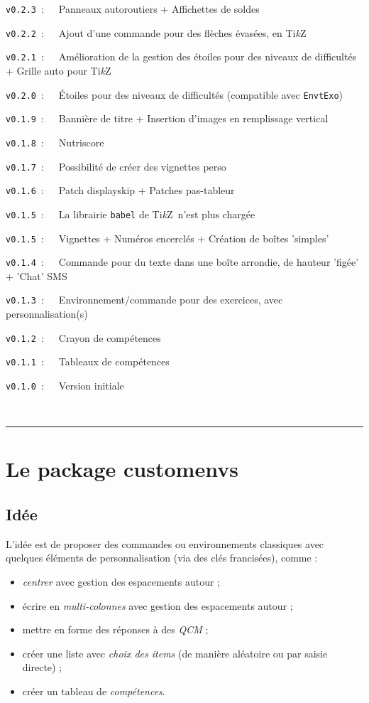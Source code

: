 \documentclass[french,11pt,a4paper]{article}
\providecommand\tikzlogo{Ti\textit{k}Z}
\let\TikZ\tikzlogo
\begin{document}
\verb|v0.2.3|~:~~~Panneaux autoroutiers + Affichettes de soldes

\verb|v0.2.2|~:~~~Ajout d'une commande pour des flèches évasées, en \TikZ\

\verb|v0.2.1|~:~~~Amélioration de la gestion des étoiles pour des niveaux de difficultés + Grille auto pour \TikZ\

\verb|v0.2.0|~:~~~Étoiles pour des niveaux de difficultés (compatible avec \texttt{EnvtExo})

\verb|v0.1.9|~:~~~Bannière de titre + Insertion d'images en remplissage vertical

\verb|v0.1.8|~:~~~Nutriscore

\verb|v0.1.7|~:~~~Possibilité de créer des vignettes \textsf{perso}

\verb|v0.1.6|~:~~~Patch \textsf{displayskip} + Patches \textsf{pas-tableur}

\verb|v0.1.5|~:~~~La librairie \texttt{babel} de \TikZ\ n'est plus chargée

\verb|v0.1.5|~:~~~Vignettes + Numéros encerclés + Création de boîtes 'simples'

\verb|v0.1.4|~:~~~Commande pour du texte dans une boîte arrondie, de hauteur 'figée' + 'Chat' SMS

\verb|v0.1.3|~:~~~Environnement/commande pour des exercices, avec personnalisation(s)

\verb|v0.1.2|~:~~~Crayon de compétences

\verb|v0.1.1|~:~~~Tableaux de compétences

\verb|v0.1.0|~:~~~Version initiale

~

\hrule

\pagebreak

\section{Le package customenvs}

\subsection{Idée}

L'idée est de proposer des commandes ou environnements classiques avec quelques éléments de personnalisation (via des \textsf{clés} francisées), comme :

\begin{itemize}
	\item \textit{centrer} avec gestion des espacements autour ;
	\item écrire en \textit{multi-colonnes} avec gestion des espacements autour ;
	\item mettre en forme des réponses à des \textit{QCM} ;
	\item créer une liste avec \textit{choix des items} (de manière aléatoire ou par saisie directe) ;
	\item créer un tableau de \textit{compétences}.
\end{itemize}
\end{document}
